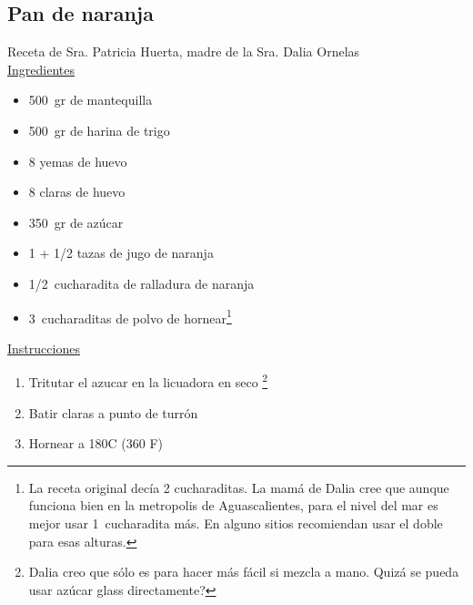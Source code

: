 \subsection{Pan de naranja}

Receta de Sra. Patricia Huerta, madre de la Sra. Dalia Ornelas\\

\underline{Ingredientes} 
\begin{itemize}
\item \SI{500}{gr} de mantequilla
\item \SI{500}{gr} de harina de trigo
\item 8 yemas  de huevo
\item 8 claras de huevo
\item \SI{350}{gr} de azúcar
\item 1 + \num{1/2} tazas de jugo de naranja
\item \SI{1/2}{cucharadita} de ralladura de naranja
\item \SI{3}{cucharaditas} de polvo de hornear\footnote{La receta original decía 2 cucharaditas. La mamá de Dalia cree que aunque funciona bien en la metropolis de Aguascalientes, para el nivel del mar es mejor usar \SI{1}{cucharadita} más. En alguno sitios recomiendan usar el doble para esas alturas.}
\end{itemize}

\underline{Instrucciones}
\begin{enumerate}
\item Tritutar el azucar en la licuadora en seco \footnote{Dalia creo que sólo es para hacer más fácil si mezcla a mano. Quizá se pueda usar azúcar glass directamente?}
\item Batir claras a punto de turrón
\item Hornear a 180C (360 F)
\end{enumerate}